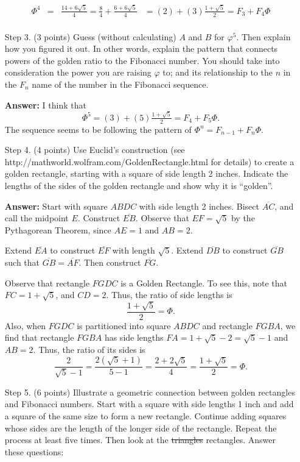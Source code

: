 \documentclass[letterpaper, 12pt]{article}
\begin{document}
\begin{enumerate}
\[\begin{array}{rcll}
\Phi^4 &=& \frac{14+6\sqrt{5}}{4} = \frac{8}{4}+\frac{6+6\sqrt{5}}{4}& = (2) + (3)\frac{1+\sqrt{5}}{2} = F_3 + F_4\Phi\\

\end{array}\]

\item [Step 3.] (3 points) Guess (without calculating) $A$ and $B$ for $φ^5$. Then explain how you figured it out. In other words, explain the pattern that connects powers of the golden ratio to the Fibonacci number. You should take into consideration the power you are raising $φ$ to; and its relationship to the $n$ in the $F_n$ name of the number in the Fibonacci sequence.

\textbf{Answer:} I think that
$$\Phi^5=(3) + (5)\tfrac{1+\sqrt{5}}{2} =F_4+F_5\Phi.$$
The sequence seems to be following the pattern of $\Phi^n=F_{n-1}+F_n\Phi$. 


\item [Step 4.] (4 points) Use Euclid’s construction (see http://mathworld.wolfram.com/GoldenRectangle.html for details) to create a golden rectangle, starting with a square of side length 2 inches. Indicate the lengths of the sides of the golden rectangle and show why it is “golden”.

\textbf{Answer:}
Start with square $ABDC$ with side length 2 inches.
\pagebreak
Bisect $\overline{AC}$, and call the midpoint $E$. 
Construct $\overline{EB}$. Observe that $EF=\sqrt{5}$ by the Pythagorean Theorem, since $AE=1$ and $AB=2$. 

\pagebreak
Extend $\overline{EA}$ to construct $\overline{EF}$ with length $\sqrt{5}$. 
Extend $\overline{DB}$ to construct $\overline{GB}$ such that $\overline{GB} = \overline{AF}$. Then construct $\overline{FG}$. 

\pagebreak
Observe that rectangle $FGDC$ is a Golden Rectangle. To see this, note that $FC=1+\sqrt{5}$, and $CD=2$. Thus, the ratio of side lengths is 
$$\frac{1+\sqrt{5}}{2}=\Phi.$$
Also, when $FGDC$ is partitioned into square $ABDC$ and rectangle $FGBA$, we find that rectangle $FGBA$ has side lengths $FA=1+\sqrt{5}-2=\sqrt{5}-1$ and $AB=2$. Thus, the ratio of its sides is 
$$\frac{2}{\sqrt{5}-1}=\frac{2(\sqrt{5}+1)}{5-1}=\frac{2+2\sqrt{5}}{4}=\frac{1+\sqrt{5}}{2}=\Phi.$$

\pagebreak
\item [Step 5.] (6 points) Illustrate a geometric connection between golden rectangles and Fibonacci numbers. Start with a square with side lengths 1 inch and add a square of the same size to form a new rectangle. Continue adding squares whose sides are the length of the longer side of the rectangle. Repeat the process at least five times. Then look at the \st{triangles} rectangles. Answer these questions:


\end{enumerate}
\end{document}
